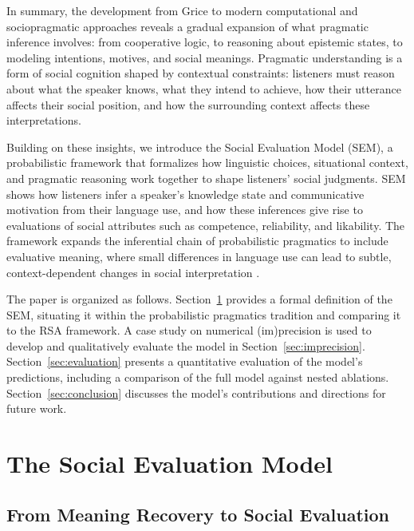 \documentclass[12pt,a4paper]{article}
\begin{document}
In summary, the development from Grice to modern computational and
sociopragmatic approaches reveals a gradual expansion of what pragmatic
inference involves: from cooperative logic, to reasoning about epistemic states,
to modeling intentions, motives, and social meanings. Pragmatic understanding is
a form of social cognition shaped by contextual constraints: listeners must
reason about what the speaker knows, what they intend to achieve, how their
utterance affects their social position, and how the surrounding context affects
these interpretations.

Building on these insights, we introduce the Social Evaluation Model (SEM), a
probabilistic framework that formalizes how linguistic choices, situational
context, and pragmatic reasoning work together to shape listeners' social
judgments. SEM shows how listeners infer a speaker's knowledge state and
communicative motivation from their language use, and how these inferences give
rise to evaluations of social attributes such as competence, reliability, and
likability. The framework expands the inferential chain of probabilistic
pragmatics to include evaluative meaning, where small differences in language
use can lead to subtle, context-dependent changes in social interpretation
\citep[e.g.,][]{beltramapapafragou2023}.

The paper is organized as follows. Section~\ref{sec:sem} provides a formal
definition of the SEM, situating it within the probabilistic pragmatics
tradition and comparing it to the RSA framework. A case study on numerical
(im)precision is used to develop and qualitatively evaluate the model in
Section~\ref{sec:imprecision}. Section~\ref{sec:evaluation} presents a
quantitative evaluation of the model's predictions, including a comparison of
the full model against nested ablations. Section~\ref{sec:conclusion} discusses
the model's contributions and directions for future work.


\section{The Social Evaluation Model}
\label{sec:sem}

\subsection{From Meaning Recovery to Social Evaluation}
\end{document}
